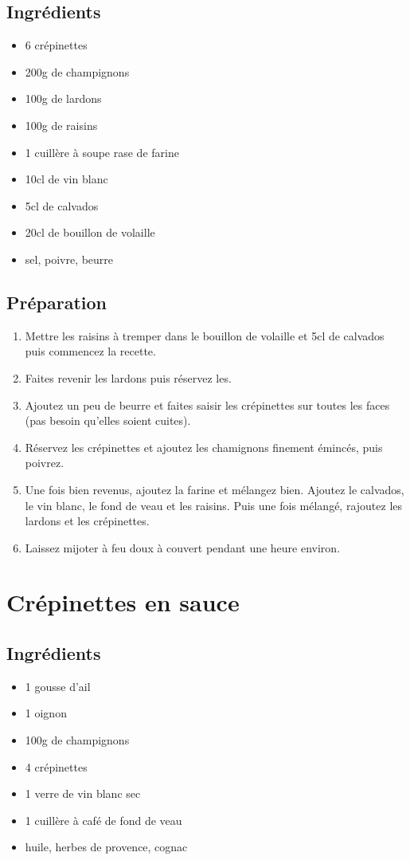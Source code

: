 \subsection*{Ingrédients}
\begin{itemize}
\item 6 crépinettes
\item 200g de champignons
\item 100g de lardons
\item 100g de raisins
\item 1 cuillère à soupe rase de farine
\item 10cl de vin blanc
\item 5cl de calvados
\item 20cl de bouillon de volaille
\item sel, poivre, beurre
\end{itemize}

\subsection*{Préparation}
\begin{enumerate}
\item Mettre les raisins à tremper dans le bouillon de volaille et 5cl de calvados puis commencez la recette.
\item Faites revenir les lardons puis réservez les.
\item Ajoutez un peu de beurre et faites saisir les crépinettes sur toutes les faces (pas besoin qu'elles soient cuites).
\item Réservez les crépinettes et ajoutez les chamignons finement émincés, puis poivrez.
\item Une fois bien revenus, ajoutez la farine et mélangez bien. Ajoutez le calvados, le vin blanc, le fond de veau et les raisins. Puis une fois mélangé, rajoutez les lardons et les crépinettes.
\item Laissez mijoter à feu doux à couvert pendant une heure environ.
\end{enumerate}



\newpage
\section{Crépinettes en sauce}
\subsection*{Ingrédients}
\begin{itemize}
\item 1 gousse d'ail
\item 1 oignon
\item 100g de champignons
\item 4 crépinettes
\item 1 verre de vin blanc sec
\item 1 cuillère à café de fond de veau
\item huile, herbes de provence, cognac
\end{itemize}

